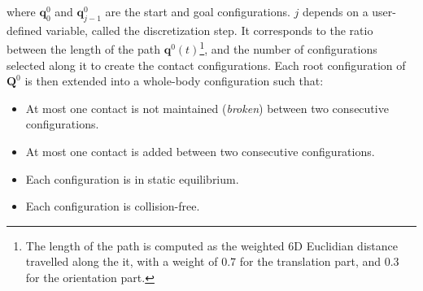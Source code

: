 where $\mathbf{q}^0_{0}$ and $\mathbf{q}^0_{j-1}$ are the start and goal configurations. %
$j$ depends on a user-defined variable, called the discretization step. It corresponds to the ratio between the length of the path $\mathbf{q}^0(t)$\footnote{The length of the path is computed as the weighted 6D Euclidian distance
travelled along the it, with a weight of $0.7$ for the translation part, and $0.3$ for the orientation part.}, and the number
of configurations selected along it to create the contact configurations. 
Each root configuration of $\mathbf{Q}^0$ is then extended into a whole-body configuration such that:
\begin{itemize} 
\item At most one contact is not maintained (\textit{broken}) between two consecutive configurations.
\item At most one contact is added between two consecutive configurations.
\item Each configuration is in static equilibrium.
\item Each configuration is collision-free.
\end{itemize} 




